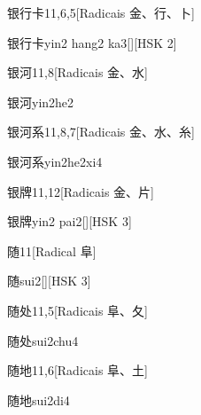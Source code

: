 \begin{entry}{银行卡}{11,6,5}[Radicais ⾦、⾏、⼘]
  \begin{phonetics}{银行卡}{yin2 hang2 ka3}[][HSK 2]
  \end{phonetics}
\end{entry}

\begin{entry}{银河}{11,8}[Radicais ⾦、⽔]
  \begin{phonetics}{银河}{yin2he2}
  \end{phonetics}
\end{entry}

\begin{entry}{银河系}{11,8,7}[Radicais ⾦、⽔、⽷]
  \begin{phonetics}{银河系}{yin2he2xi4}
  \end{phonetics}
\end{entry}

\begin{entry}{银牌}{11,12}[Radicais ⾦、⽚]
  \begin{phonetics}{银牌}{yin2 pai2}[][HSK 3]
  \end{phonetics}
\end{entry}

\begin{entry}{随}{11}[Radical ⾩]
  \begin{phonetics}{随}{sui2}[][HSK 3]
  \end{phonetics}
\end{entry}

\begin{entry}{随处}{11,5}[Radicais ⾩、⼡]
  \begin{phonetics}{随处}{sui2chu4}
  \end{phonetics}
\end{entry}

\begin{entry}{随地}{11,6}[Radicais ⾩、⼟]
  \begin{phonetics}{随地}{sui2di4}
  \end{phonetics}
\end{entry}

